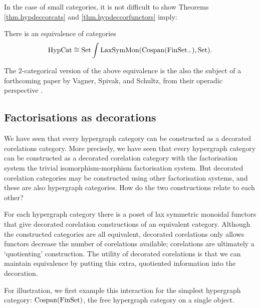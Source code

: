 In the case of small categories, it is not difficult to show Theorems
\ref{thm.hypdeccorcats} and \ref{thm.hypdeccorfunctors} imply:

\begin{theorem}
  There is an equivalence of categories
\[
  \mathrm{HypCat} \cong \mathrm{Set}\int \mathrm{LaxSymMon}(\operatorname{{Cospan}}(\mathrm{FinSet}_{-}), \mathrm{Set}).
\]
\end{theorem}

The 2-categorical version of the above equivalence is the also the subject of a
forthcoming paper by Vagner, Spivak, and Schultz, from their operadic
perspective \cite{SpiSchRup}.

\subsection{Factorisations as decorations}

We have seen that every hypergraph category can be constructed as a decorated
corelations category. More precisely, we have seen that every hypergraph
category can be constructed as a decorated corelation category with the
factorisation system the trivial isomorphism-morphism factorisation system. But
decorated corelation categories may be constructed using other factorisation
systems, and these are also hypergraph categories. How do the two constructions
relate to each other?

For each hypergraph category there is a poset of lax symmetric monoidal functors
that give decorated corelation constructions of an equivalent category.
Although the constructed categories are all equivalent, decorated corelations
only allows functors decrease the number of corelations available; corelations
are ultimately a `quotienting' construction.  The utility of decorated
corelations is that we can maintain equivalence by putting this extra,
quotiented information into the decoration.

For illustration, we first example this interaction for the simplest hypergraph
category: $\operatorname{{Cospan}}(\mathrm{FinSet})$, the free hypergraph category on a single object.


